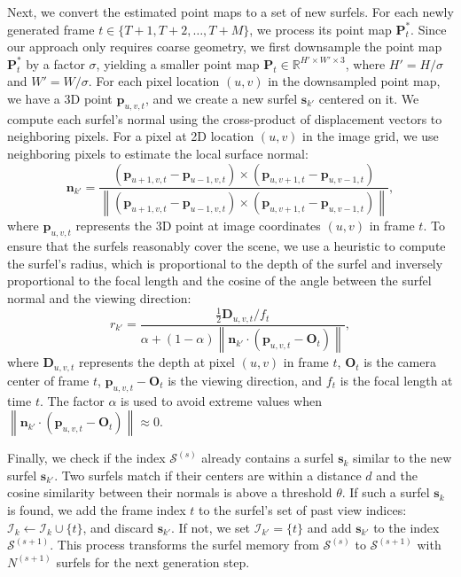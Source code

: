 Next, we convert the estimated point maps to a set of new surfels.
For each newly generated frame $t \in \{T+1, T+2, \ldots, T+M\}$, we process its point map $\mathbf{P}^*_t$.
Since our approach only requires coarse geometry, we first downsample the point map $\mathbf{P}^*_t$ by a factor $\sigma$, yielding a smaller point map $\mathbf{P}_t \in \mathbb{R}^{H' \times W' \times 3}$, where $H' = H/\sigma$ and $W' = W/\sigma$.
For each pixel location $(u,v)$ in the downsampled point map, we have a 3D point $\mathbf{p}_{u,v,t}$, and we create a new surfel $\mathbf{s}_{k'}$ centered on it.
We compute each surfel's normal using the cross-product of displacement vectors to neighboring pixels.
For a pixel at 2D location $(u,v)$ in the image grid, we use neighboring pixels to estimate the local surface normal:
\[
\mathbf{n}_{k'} = \frac{(\mathbf{p}_{u+1,v,t} - \mathbf{p}_{u-1,v,t}) \times (\mathbf{p}_{u,v+1,t} - \mathbf{p}_{u,v-1,t})}{\left \| (\mathbf{p}_{u+1,v,t} - \mathbf{p}_{u-1,v,t}) \times (\mathbf{p}_{u,v+1,t} - \mathbf{p}_{u,v-1,t}) \right \|},
\]
where $\mathbf{p}_{u,v,t}$ represents the 3D point at image coordinates $(u,v)$ in frame $t$.
To ensure that the surfels reasonably cover the scene, we use a heuristic to compute the surfel's radius, which is proportional to the depth of the surfel and inversely proportional to the focal length and the cosine of the angle between the surfel normal and the viewing direction:
\[
r_{k'} = \frac{\frac{1}{2}\mathbf{D}_{u,v,t}/f_t}{\alpha + (1 - \alpha)\left \| \mathbf{n}_{k'} \cdot (\mathbf{p}_{u,v,t} - \mathbf{O}_t) \right \|},
\]
where $\mathbf{D}_{u,v,t}$ represents the depth at pixel $(u,v)$ in frame $t$, $\mathbf{O}_t$ is the camera center of frame $t$, $\mathbf{p}_{u,v,t} - \mathbf{O}_t$ is the viewing direction, and $f_t$ is the focal length at time $t$.
The factor $\alpha$ is used to avoid extreme values when $\left \| \mathbf{n}_{k'} \cdot (\mathbf{p}_{u,v,t} - \mathbf{O}_t) \right \| \approx 0$.

Finally, we check if the index $\mathcal{S}^{(s)}$ already contains a surfel $\mathbf{s}_k$ similar to the new surfel $\mathbf{s}_{k'}$.
Two surfels match if their centers are within a distance $d$ and the cosine similarity between their normals is above a threshold $\theta$.
If such a surfel $\mathbf{s}_k$ is found, we add the frame index $t$ to the surfel's set of past view indices: $\mathcal{I}_k \leftarrow \mathcal{I}_k \cup \{t\}$, and discard $\mathbf{s}_{k'}$.
If not, we set $\mathcal{I}_{k'} = \{t\}$ and add $\mathbf{s}_{k'}$ to the index $\mathcal{S}^{(s+1)}$.
This process transforms the surfel memory from $\mathcal{S}^{(s)}$ to $\mathcal{S}^{(s+1)}$ with $N^{(s+1)}$ surfels for the next generation step.

